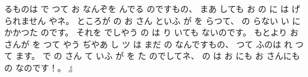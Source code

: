 るものは
で%
つて
お
なんぞを
んでる
のですもの、
%
まあ
しても
お
%
の
に
は
げられません
やネ。
%
ところが
の
お
さん
といふ
が
を
らつて、
%
の
らない
い
に
かかつた
のです。
%
それを
でしやう
の
は
り
いても
ないのです。
%
もとより
お
さんが
を
つて
やう
ぢやあ
し
ツ
は
まだ
の
なんですもの、
%
つて
ふのは
れ
つて
ます。
%
で
の
さん
て
いふ
が
を
た
のでしてネ、
%
の
は
お
にも
お
さんにも
の
なのです！。
』

